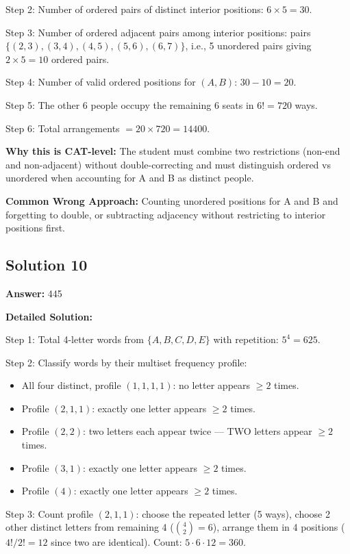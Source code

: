 \documentclass[11pt]{article}
\begin{document}
Step 2: Number of ordered pairs of distinct interior positions: \( 6 \times 5 = 30 \).

Step 3: Number of ordered adjacent pairs among interior positions: pairs \( \{(2,3), (3,4), (4,5), (5,6), (6,7)\} \), i.e., 5 unordered pairs giving \( 2 \times 5 = 10 \) ordered pairs.

Step 4: Number of valid ordered positions for \( (A, B) \): \( 30 - 10 = 20 \).

Step 5: The other 6 people occupy the remaining 6 seats in \( 6! = 720 \) ways.

Step 6: Total arrangements \( = 20 \times 720 = 14400 \).

\textbf{Why this is CAT-level:} The student must combine two restrictions (non-end and non-adjacent) without double-correcting and must distinguish ordered vs unordered when accounting for A and B as distinct people.

\textbf{Common Wrong Approach:} Counting unordered positions for A and B and forgetting to double, or subtracting adjacency without restricting to interior positions first.

\subsection*{Solution 10}
\textbf{Answer:} 445

\textbf{Detailed Solution:}

Step 1: Total 4-letter words from \( \{A,B,C,D,E\} \) with repetition: \( 5^4 = 625 \).

Step 2: Classify words by their multiset frequency profile:
\begin{itemize}
\item All four distinct, profile \( (1,1,1,1) \): no letter appears \( \ge 2 \) times.
\item Profile \( (2,1,1) \): exactly one letter appears \( \ge 2 \) times. \checkmark
\item Profile \( (2,2) \): two letters each appear twice --- TWO letters appear \( \ge 2 \) times.
\item Profile \( (3,1) \): exactly one letter appears \( \ge 2 \) times. \checkmark
\item Profile \( (4) \): exactly one letter appears \( \ge 2 \) times. \checkmark
\end{itemize}

Step 3: Count profile \( (2,1,1) \): choose the repeated letter (5 ways), choose 2 other distinct letters from remaining 4 (\( \binom{4}{2}=6 \)), arrange them in 4 positions (\( 4!/2! = 12 \) since two are identical). Count: \( 5 \cdot 6 \cdot 12 = 360 \).
\end{document}
